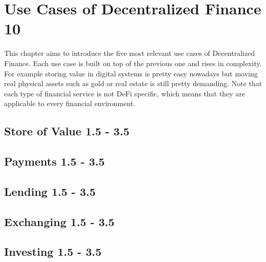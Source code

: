 \chapter{Use Cases of Decentralized Finance 10}
\label{cha:UseCasesDecentralizedFinance}

This chapter aims to introduce the five most relevant use cases of Decentralized Finance. Each use case is built on top of the previous one and rises in complexity. For example storing value in digital systems is pretty easy nowadays but moving real physical assets such as gold or real estate is still pretty demanding. Note that each type of financial service is not DeFi specific, which means that they are applicable to every financial environment.
\section{Store of Value 1.5 - 3.5}
\section{Payments 1.5 - 3.5}
\section{Lending 1.5 - 3.5}
\section{Exchanging 1.5 - 3.5}
\section{Investing 1.5 - 3.5}